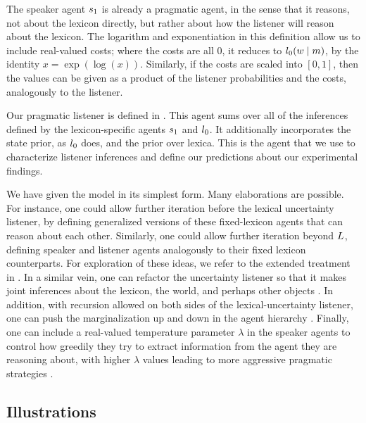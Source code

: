\documentclass[leqno,12pt]{article}
\begin{document}
The speaker agent $s_{1}$ is already a pragmatic agent, in the
sense that it reasons, not about the lexicon directly, but rather
about how the listener will reason about the lexicon. The logarithm
and exponentiation in this definition allow us to include real-valued
costs; where the costs are all $0$, it reduces to
$l_{0}(w \mid m)$, by the identity $x =
\exp(\log(x))$.  Similarly, if the costs are scaled into $[0,1]$, then
the values can be given as a product of the listener probabilities and
the costs, analogously to the listener.

Our pragmatic listener is defined in . This agent
sums over all of the inferences defined by the lexicon-specific agents
$s_{1}$ and $l_{0}$. It additionally incorporates the
state prior, as $l_{0}$ does, and the prior over lexica.  This
is the agent that we use to characterize listener inferences and
define our predictions about our experimental findings.

We have given the model in its simplest form. Many elaborations are
possible. For instance, one could allow further iteration before the
lexical uncertainty listener, by defining generalized versions of
these fixed-lexicon agents that can reason about each
other. Similarly, one could allow further iteration beyond
$L$, defining speaker and listener agents
analogously to their fixed lexicon counterparts.  For exploration of
these ideas, we refer to the extended treatment in
\citealt{Bergen:Levy:Goodman:2014}. In a similar vein, one can
refactor the uncertainty listener so that it makes joint inferences
about the lexicon, the world, and perhaps other objects
\citep{Smith:Goodman:Frank:2013, Kao-etal:2014}. In addition, with
recursion allowed on both sides of the lexical-uncertainty listener,
one can push the marginalization up and down in the agent hierarchy
\citep{Goodman:Lassiter:2013}. Finally, one can include a real-valued
temperature parameter $\lambda$ in the speaker agents to control how
greedily they try to extract information from the agent they are
reasoning about, with higher $\lambda$ values leading to more
aggressive pragmatic strategies
\citep{Sutton:Barto:1998,Bergen:Levy:Goodman:2014}.


\subsection{Illustrations}\label{sec:illustrations}
\end{document}
